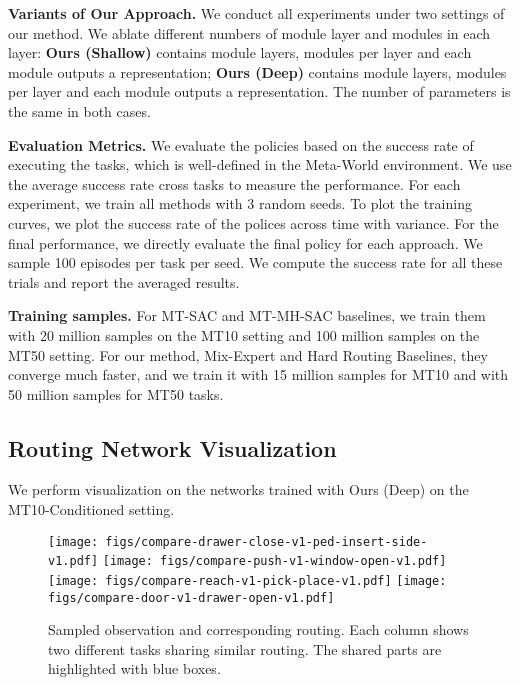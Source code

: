 \documentclass{article}
\begin{document}
\textbf{Variants of Our Approach.} We conduct all experiments under two settings of our method. We ablate different numbers of module layer and modules in each layer: \textbf{Ours (Shallow)} contains  module layers,  modules per layer and each module outputs a  representation; \textbf{Ours (Deep)} contains  module layers,  modules per layer and each module outputs a  representation. The number of parameters is the same in both cases.


\textbf{Evaluation Metrics.} We evaluate the policies based on the success rate of executing the tasks, which is well-defined in the Meta-World environment\cite{yu2019meta}. We use the average success rate cross tasks to measure the performance. For each experiment, we train all methods with 3 random seeds. To plot the training curves, we plot the success rate of the polices across time with variance. For the final performance, we directly evaluate the final policy for each approach. We sample 100 episodes per task per seed. We compute the success rate for all these trials and report the averaged results. 

\textbf{Training samples.} For MT-SAC and MT-MH-SAC baselines, we train them with 20 million samples on the MT10 setting and 100 million samples on the MT50 setting. For our method, Mix-Expert and Hard Routing Baselines, they converge much faster, and we train it with 15 million samples for MT10 and with 50 million samples for MT50 tasks. 


\vspace{-0.1in}
\subsection{Routing Network Visualization}
\vspace{-0.1in}

We perform visualization on the networks trained with Ours (Deep) on the MT10-Conditioned setting. 

\begin{figure}
\centering
\texttt{[image: figs/compare-drawer-close-v1-ped-insert-side-v1.pdf]}
\texttt{[image: figs/compare-push-v1-window-open-v1.pdf]}
\texttt{[image: figs/compare-reach-v1-pick-place-v1.pdf]}
\texttt{[image: figs/compare-door-v1-drawer-open-v1.pdf]}
\vspace{-0.05in}
    \caption{\small{Sampled observation and corresponding routing. Each column shows two different tasks sharing similar routing. 
The shared parts are highlighted with blue boxes.}
    }
	\label{figure:demo}
    \vspace{-0.2in}
 \end{figure}
\end{document}
